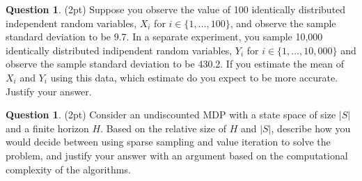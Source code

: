 \documentclass{article}
\theoremstyle{definition}
\newtheorem{question}[thm]{Question}
\begin{document}
\begin{question}
    (2pt) Suppose you observe the value of 100 identically distributed independent random variables, $X_i$ for $i \in \{1,\ldots,100\}$, and observe the sample standard deviation to be 9.7. In a separate experiment, you sample 10,000 identically distributed indipendent random variables, $Y_i$ for $i \in \{1,\ldots, 10,000\}$ and observe the sample standard deviation to be 430.2.
    If you estimate the mean of $X_i$ and $Y_i$ using this data, which estimate do you expect to be more accurate. Justify your answer.
\end{question}

\begin{question}
    (2pt) Consider an undiscounted MDP with a state space of size $|S|$ and a finite horizon $H$. Based on the relative size of $H$ and $|S|$, describe how you would decide between using sparse sampling and value iteration to solve the problem, and justify your answer with an argument based on the computational complexity of the algorithms.
\end{question}
\end{document}
